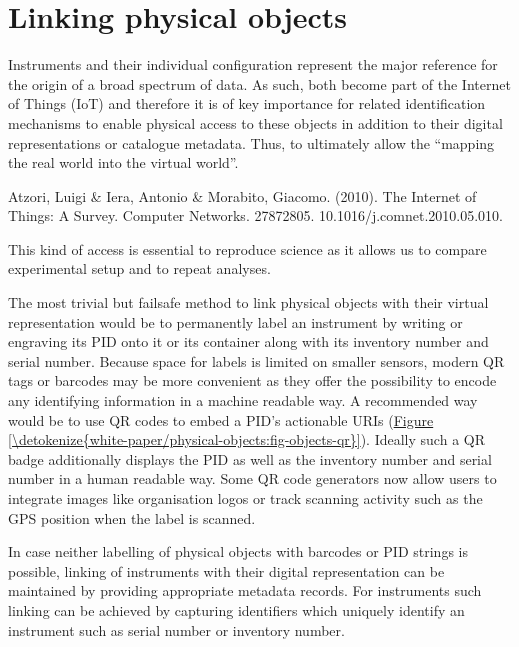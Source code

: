 \documentclass[a4paper,10pt,english]{sphinxmanual}
\begin{document}
\section{Linking physical objects}
\label{\detokenize{white-paper/physical-objects:linking-physical-objects}}\label{\detokenize{white-paper/physical-objects::doc}}
\sphinxAtStartPar
Instruments and their individual configuration represent the major
reference for the origin of a broad spectrum of data. As such, both
become part of the Internet of Things (IoT) and therefore it is of key
importance for related identification mechanisms to enable physical
access to these objects in addition to their digital representations or
catalogue metadata. Thus, to ultimately allow the “mapping the real
world into the virtual world”.%
\begin{footnote}[1]\sphinxAtStartFootnote
Atzori, Luigi \& Iera, Antonio \& Morabito, Giacomo. (2010). The
Internet of Things: A Survey. Computer Networks. 2787\sphinxhyphen{}2805.
10.1016/j.comnet.2010.05.010.
%
\end{footnote} This kind of access is
essential to reproduce science as it allows us to compare experimental
setup and to repeat analyses.

\sphinxAtStartPar
The most trivial but failsafe method to link physical objects with their
virtual representation would be to permanently label an instrument by
writing or engraving its PID onto it or its container along with its
inventory number and serial number. Because space for labels is limited
on smaller sensors, modern QR tags or barcodes may be more convenient as
they offer the possibility to encode any identifying information in a
machine readable way. A recommended way would be to use QR codes to
embed a PID’s actionable URIs (\hyperref[\detokenize{white-paper/physical-objects:fig-objects-qr}]{Figure \ref{\detokenize{white-paper/physical-objects:fig-objects-qr}}}). Ideally such
a QR badge additionally displays the PID as well as the inventory
number and serial number in a human readable way. Some QR code
generators now allow users to integrate images like organisation logos
or track scanning activity such as the GPS position when the label is
scanned.

\sphinxAtStartPar
In case neither labelling of physical objects with barcodes or PID
strings is possible, linking of instruments with their digital
representation can be maintained by providing appropriate metadata
records. For instruments such linking can be achieved by capturing
identifiers which uniquely identify an instrument such as serial number
or inventory number.
\end{document}
